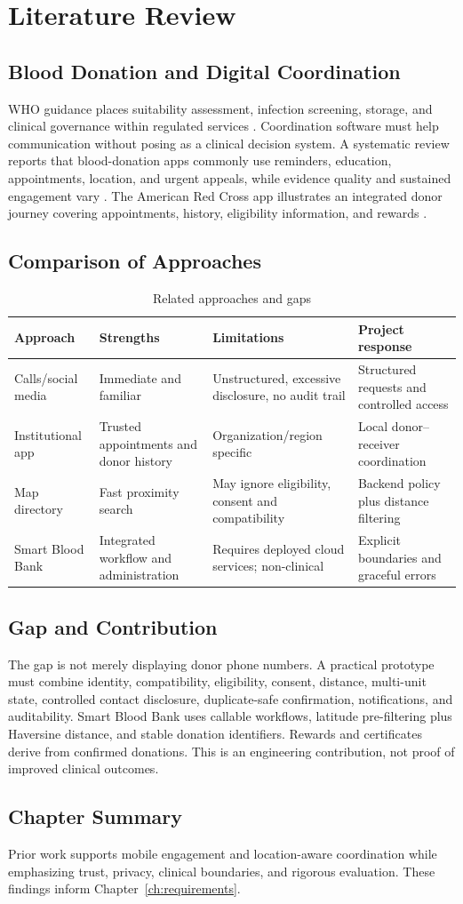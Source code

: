 \chapter{Literature Review}\label{ch:literature}
\section{Blood Donation and Digital Coordination}
WHO guidance places suitability assessment, infection screening, storage, and clinical governance within regulated services \cite{whoBloodSafety,whoDonationFAQ}. Coordination software must help communication without posing as a clinical decision system. A systematic review reports that blood-donation apps commonly use reminders, education, appointments, location, and urgent appeals, while evidence quality and sustained engagement vary \cite{li2023mobile}. The American Red Cross app illustrates an integrated donor journey covering appointments, history, eligibility information, and rewards \cite{redCrossApp}.
\section{Comparison of Approaches}
\begin{table}[H]\centering\small\caption{Related approaches and gaps}
\begin{tabularx}{\textwidth}{p{3cm}XXX}\toprule Approach&Strengths&Limitations&Project response\\\midrule
Calls/social media&Immediate and familiar&Unstructured, excessive disclosure, no audit trail&Structured requests and controlled access\\
Institutional app&Trusted appointments and donor history&Organization/region specific&Local donor--receiver coordination\\
Map directory&Fast proximity search&May ignore eligibility, consent and compatibility&Backend policy plus distance filtering\\
Smart Blood Bank&Integrated workflow and administration&Requires deployed cloud services; non-clinical&Explicit boundaries and graceful errors\\\bottomrule
\end{tabularx}\end{table}
\section{Gap and Contribution}
The gap is not merely displaying donor phone numbers. A practical prototype must combine identity, compatibility, eligibility, consent, distance, multi-unit state, controlled contact disclosure, duplicate-safe confirmation, notifications, and auditability. Smart Blood Bank uses callable workflows, latitude pre-filtering plus Haversine distance, and stable donation identifiers. Rewards and certificates derive from confirmed donations. This is an engineering contribution, not proof of improved clinical outcomes.
\section{Chapter Summary}
Prior work supports mobile engagement and location-aware coordination while emphasizing trust, privacy, clinical boundaries, and rigorous evaluation. These findings inform Chapter~\ref{ch:requirements}.

